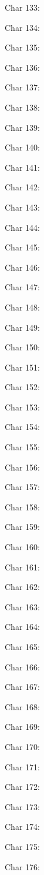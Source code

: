 Char 133: 

Char 134: 

Char 135: 

Char 136: 

Char 137: 

Char 138: 

Char 139: 

Char 140: 

Char 141: 

Char 142: 

Char 143: 

Char 144: 

Char 145: 

Char 146: 

Char 147: 

Char 148: 

Char 149: 

Char 150: 

Char 151: 

Char 152: 

Char 153: 

Char 154: 

Char 155: 

Char 156: 

Char 157: 

Char 158: 

Char 159: 

Char 160: 

Char 161: 

Char 162: 

Char 163: 

Char 164: 

Char 165: 

Char 166: 

Char 167: 

Char 168: 

Char 169: 

Char 170: 

Char 171: 

Char 172: 

Char 173: 

Char 174: 

Char 175: 

Char 176: 

